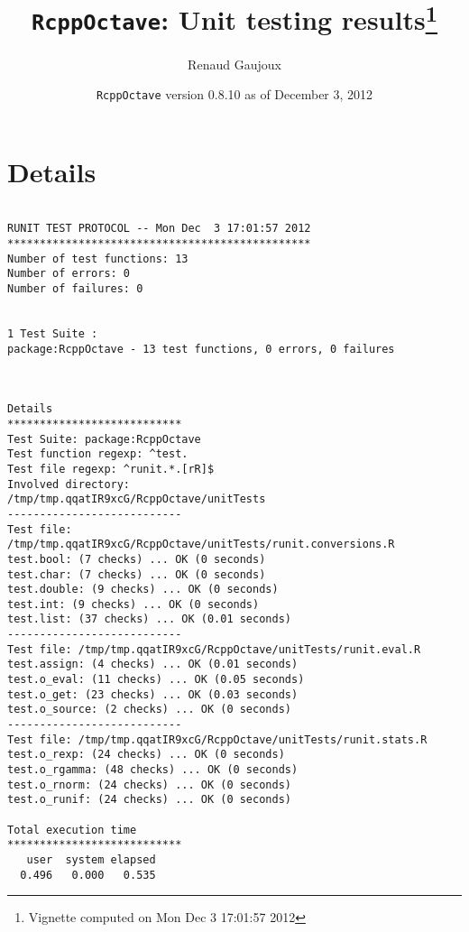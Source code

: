 \documentclass[10pt]{article}
\author{Renaud Gaujoux}
\title{\texttt{RcppOctave}: Unit testing results\footnote{Vignette computed  on Mon Dec  3 17:01:57 2012}}
\date{\texttt{RcppOctave} version 0.8.10 as of December  3, 2012}
\begin{document}
\maketitle

\section{Details}
\begin{verbatim}

RUNIT TEST PROTOCOL -- Mon Dec  3 17:01:57 2012 
*********************************************** 
Number of test functions: 13 
Number of errors: 0 
Number of failures: 0 

 
1 Test Suite : 
package:RcppOctave - 13 test functions, 0 errors, 0 failures



Details 
*************************** 
Test Suite: package:RcppOctave 
Test function regexp: ^test. 
Test file regexp: ^runit.*.[rR]$ 
Involved directory: 
/tmp/tmp.qqatIR9xcG/RcppOctave/unitTests 
--------------------------- 
Test file: /tmp/tmp.qqatIR9xcG/RcppOctave/unitTests/runit.conversions.R 
test.bool: (7 checks) ... OK (0 seconds)
test.char: (7 checks) ... OK (0 seconds)
test.double: (9 checks) ... OK (0 seconds)
test.int: (9 checks) ... OK (0 seconds)
test.list: (37 checks) ... OK (0.01 seconds)
--------------------------- 
Test file: /tmp/tmp.qqatIR9xcG/RcppOctave/unitTests/runit.eval.R 
test.assign: (4 checks) ... OK (0.01 seconds)
test.o_eval: (11 checks) ... OK (0.05 seconds)
test.o_get: (23 checks) ... OK (0.03 seconds)
test.o_source: (2 checks) ... OK (0 seconds)
--------------------------- 
Test file: /tmp/tmp.qqatIR9xcG/RcppOctave/unitTests/runit.stats.R 
test.o_rexp: (24 checks) ... OK (0 seconds)
test.o_rgamma: (48 checks) ... OK (0 seconds)
test.o_rnorm: (24 checks) ... OK (0 seconds)
test.o_runif: (24 checks) ... OK (0 seconds)

Total execution time
***************************
   user  system elapsed 
  0.496   0.000   0.535 

\end{verbatim}
\end{document}
